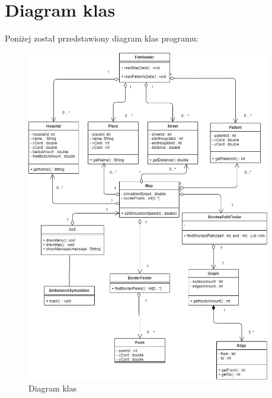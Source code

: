 \documentclass[12pt,a4paper]{article}
\begin{document}
\section{Diagram klas}

Poniżej został przedstawiony diagram klas programu:

\begin{figure}[h!]
\centering
\includegraphics[width=0.95\textwidth]{Diagram}
\caption{Diagram klas} 
\label{fig:Diagram}
\end{figure}
\end{document}
